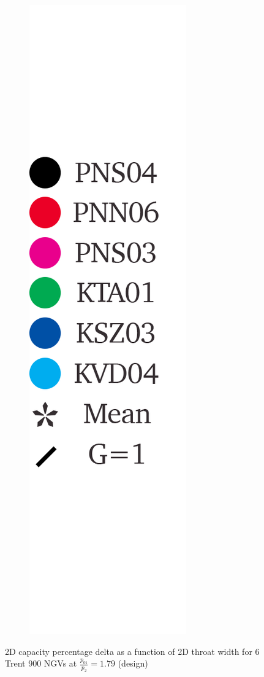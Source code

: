 \documentclass[a4paper, 11pt, oneside]{report}
\begin{document}
\begin{figure}[H]
\begin{subfigure}{.1125\textwidth}
		\includegraphics[width=\linewidth]{figs/t900_throat_widths_legend.png}
	\end{subfigure}
	\caption{2D capacity percentage delta as a function of 2D throat width for 6 Trent 900 NGVs at $\frac{p_{01}}{p_2}=1.79$ (design)}
      \label{fig:T900_2d_capacities_vs_throat_widths}
\end{figure}
\end{document}

